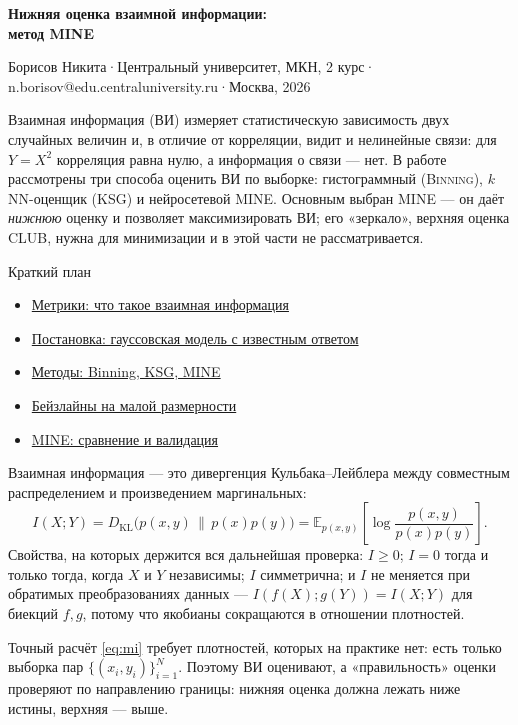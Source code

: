 \documentclass[10pt,a4paper]{article}
\makeatletter
\newcommand{\lesson}[2]{%
  \par\addvspace{16pt plus 4pt}%
  \phantomsection\hypertarget{sec:#1}{}%
  \noindent{\mediumfont\fontsize{12.5}{15}\selectfont
    \MakeUppercase{#1.\enspace#2}}\par
  \addvspace{5pt}}
\newcommand{\titleblock}{%
  \par\addvspace{4pt}%
  {\fontsize{20}{23.5}\selectfont\bfseries Нижняя оценка взаимной информации:\\ метод MINE}\par
  \addvspace{7pt}%
  {\fontsize{8.5}{10.5}\selectfont\color{muted}%
   Борисов Никита\enspace·\enspace Центральный университет, МКН, 2 курс\enspace·\enspace
   n.borisov@edu.centraluniversity.ru\enspace·\enspace Москва, 2026}\par
  \addvspace{14pt}}
\makeatother
\begin{document}
\thispagestyle{fancy}
\titleblock

Взаимная информация (ВИ) измеряет статистическую зависимость двух случайных
величин и, в отличие от корреляции, видит и нелинейные связи: для $Y=X^2$
корреляция равна нулю, а информация о связи — нет. В работе рассмотрены три
способа оценить ВИ по выборке: гистограммный (\textsc{Binning}), $k$NN-оценщик
(\textsc{KSG}) и нейросетевой \textsc{MINE}. Основным выбран \textsc{MINE} —
он даёт \emph{нижнюю} оценку и позволяет максимизировать ВИ; его «зеркало»,
верхняя оценка \textsc{CLUB}, нужна для минимизации и в этой части не
рассматривается.

{\fontsize{8}{10}\selectfont\color{muted}Краткий план}\par\addvspace{2pt}
\begin{itemize}[leftmargin=2.2em, label={\color{linkblue}\small$\bullet$}, itemsep=1pt]
  \item \hyperlink{sec:1}{Метрики: что такое взаимная информация}
  \item \hyperlink{sec:2}{Постановка: гауссовская модель с известным ответом}
  \item \hyperlink{sec:3}{Методы: Binning, KSG, MINE}
  \item \hyperlink{sec:4}{Бейзлайны на малой размерности}
  \item \hyperlink{sec:5}{MINE: сравнение и валидация}
\end{itemize}

\lesson{1}{Метрики}

Взаимная информация — это дивергенция Кульбака--Лейблера между совместным
распределением и произведением маргинальных:
\begin{equation}\label{eq:mi}
  I(X;Y) = D_{\mathrm{KL}}\big(p(x,y)\,\|\,p(x)p(y)\big)
         = \mathbb{E}_{p(x,y)}\!\left[\log\frac{p(x,y)}{p(x)p(y)}\right].
\end{equation}
Свойства, на которых держится вся дальнейшая проверка: $I\ge 0$; $I=0$
тогда и только тогда, когда $X$ и $Y$ независимы; $I$ симметрична; и $I$ не
меняется при обратимых преобразованиях данных — $I(f(X);g(Y))=I(X;Y)$ для
биекций $f,g$, потому что якобианы сокращаются в отношении плотностей.

Точный расчёт \eqref{eq:mi} требует плотностей, которых на практике нет: есть
только выборка пар $\{(x_i,y_i)\}_{i=1}^N$. Поэтому ВИ оценивают, а
«правильность» оценки проверяют по направлению границы: нижняя оценка должна
лежать ниже истины, верхняя — выше.
\end{document}
